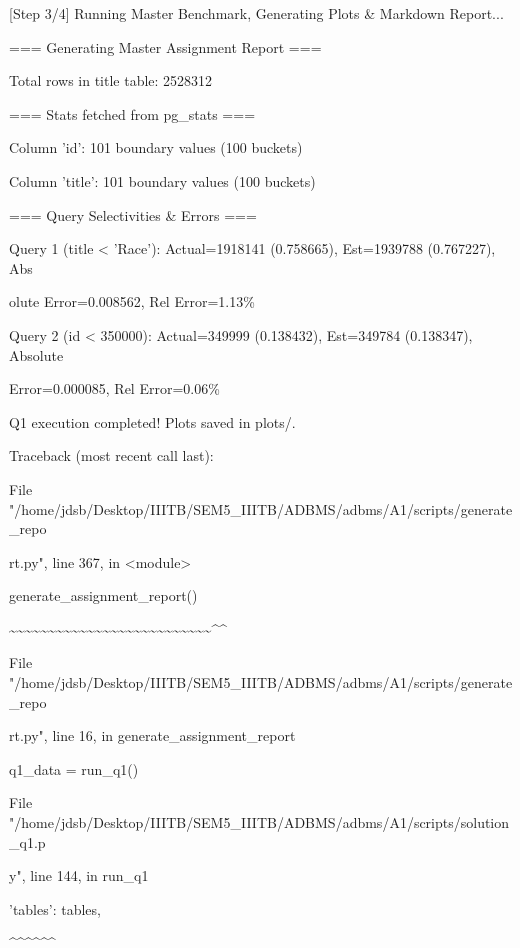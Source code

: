 \documentclass[11pt,a4paper]{article}
\begin{document}
[Step 3/4] Running Master Benchmark, Generating Plots \& Markdown Report...

=== Generating Master Assignment Report ===

Total rows in title table: 2528312

=== Stats fetched from pg\_stats ===

Column 'id': 101 boundary values (100 buckets)

Column 'title': 101 boundary values (100 buckets)

=== Query Selectivities \& Errors ===

Query 1 (title < 'Race'): Actual=1918141 (0.758665), Est=1939788 (0.767227), Abs

olute Error=0.008562, Rel Error=1.13\%

Query 2 (id < 350000): Actual=349999 (0.138432), Est=349784 (0.138347), Absolute

Error=0.000085, Rel Error=0.06\%

Q1 execution completed! Plots saved in plots/.

Traceback (most recent call last):

File "/home/jdsb/Desktop/IIITB/SEM5\_IIITB/ADBMS/adbms/A1/scripts/generate\_repo

rt.py", line 367, in <module>

generate\_assignment\_report()

\textasciitilde{}\textasciitilde{}\textasciitilde{}\textasciitilde{}\textasciitilde{}\textasciitilde{}\textasciitilde{}\textasciitilde{}\textasciitilde{}\textasciitilde{}\textasciitilde{}\textasciitilde{}\textasciitilde{}\textasciitilde{}\textasciitilde{}\textasciitilde{}\textasciitilde{}\textasciitilde{}\textasciitilde{}\textasciitilde{}\textasciitilde{}\textasciitilde{}\textasciitilde{}\textasciitilde{}\textasciitilde{}\textasciitilde{}\textasciicircum{}\textasciicircum{}

File "/home/jdsb/Desktop/IIITB/SEM5\_IIITB/ADBMS/adbms/A1/scripts/generate\_repo

rt.py", line 16, in generate\_assignment\_report

q1\_data = run\_q1()

File "/home/jdsb/Desktop/IIITB/SEM5\_IIITB/ADBMS/adbms/A1/scripts/solution\_q1.p

y", line 144, in run\_q1

'tables': tables,

\textasciicircum{}\textasciicircum{}\textasciicircum{}\textasciicircum{}\textasciicircum{}\textasciicircum{}
\end{document}
